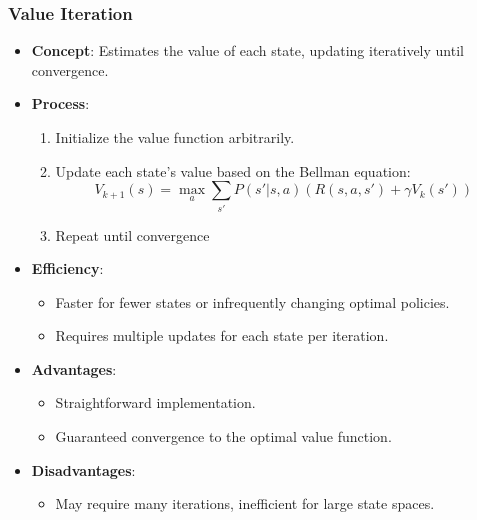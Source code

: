 \documentclass[aspectratio=169]{beamer}
\begin{document}
\begin{frame}[fragile]
    \frametitle{Value Iteration}
    \begin{itemize}
        \item \textbf{Concept}: Estimates the value of each state, updating iteratively until convergence.
        \item \textbf{Process}:
            \begin{enumerate}
                \item Initialize the value function arbitrarily.
                \item Update each state’s value based on the Bellman equation:
                    \begin{equation}
                    V_{k+1}(s) = \max_a \sum_{s'} P(s' | s, a) \left( R(s, a, s') + \gamma V_k(s') \right)
                    \end{equation}
                \item Repeat until convergence
            \end{enumerate}
        \item \textbf{Efficiency}:
            \begin{itemize}
                \item Faster for fewer states or infrequently changing optimal policies.
                \item Requires multiple updates for each state per iteration.
            \end{itemize}
        \item \textbf{Advantages}:
            \begin{itemize}
                \item Straightforward implementation.
                \item Guaranteed convergence to the optimal value function.
            \end{itemize}
        \item \textbf{Disadvantages}:
            \begin{itemize}
                \item May require many iterations, inefficient for large state spaces.
            \end{itemize}
    \end{itemize}
\end{frame}
\end{document}
